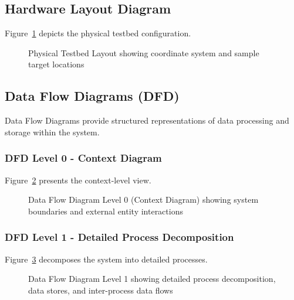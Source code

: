 \subsection{Hardware Layout Diagram}
\label{subsec:hardware-layout-diagram}

Figure~\ref{fig:hardware-layout} depicts the physical testbed configuration.

\begin{figure}[htbp]
    \centering
    \resizebox{0.85\textwidth}{!}{}
    \caption{Physical Testbed Layout showing coordinate system and sample target locations}
    \label{fig:hardware-layout}
\end{figure}

\subsection{Data Flow Diagrams (DFD)}
\label{subsec:dfd-diagrams}

Data Flow Diagrams provide structured representations of data processing and storage within the system.

\subsubsection{DFD Level 0 - Context Diagram}
\label{subsubsec:dfd-level0}

Figure~\ref{fig:dfd-level0} presents the context-level view.

\begin{figure}[htbp]
    \centering
    \resizebox{0.9\textwidth}{!}{}
    \caption{Data Flow Diagram Level 0 (Context Diagram) showing system boundaries and external entity interactions}
    \label{fig:dfd-level0}
\end{figure}

\subsubsection{DFD Level 1 - Detailed Process Decomposition}
\label{subsubsec:dfd-level1}

Figure~\ref{fig:dfd-level1} decomposes the system into detailed processes.

\begin{figure}[htbp]
    \centering
    \resizebox{0.95\textwidth}{!}{}
    \caption{Data Flow Diagram Level 1 showing detailed process decomposition, data stores, and inter-process data flows}
    \label{fig:dfd-level1}
\end{figure}

